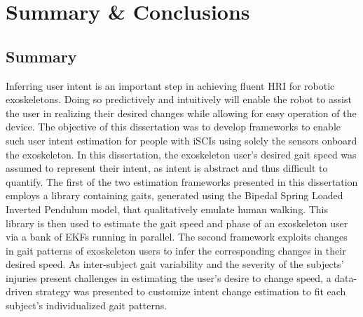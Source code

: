 \chapter{Summary \& Conclusions}\label{chapter:conc}
\section{Summary}
Inferring user intent is an important step in achieving fluent HRI for robotic exoskeletons. Doing so predictively and intuitively will enable the robot to assist the user in realizing their desired changes while allowing for easy operation of the device. The objective of this dissertation was to develop frameworks to enable such user intent estimation for people with iSCIs using solely the sensors onboard the exoskeleton. In this dissertation, the exoskeleton user's desired gait speed was assumed to represent their intent, as intent is abstract and thus difficult to quantify. The first of the two estimation frameworks presented in this dissertation employs a library containing gaits, generated using the Bipedal Spring Loaded Inverted Pendulum model, that qualitatively emulate human walking. This library is then used to estimate the gait speed and phase of an exoskeleton user via a bank of EKFs running in parallel. The second framework exploits changes in gait patterns of exoskeleton users to infer the corresponding changes in their desired speed. As inter-subject gait variability and the severity of the subjects' injuries present challenges in estimating the user's desire to change speed, a data-driven strategy was presented to customize intent change estimation to fit each subject's individualized gait patterns.


